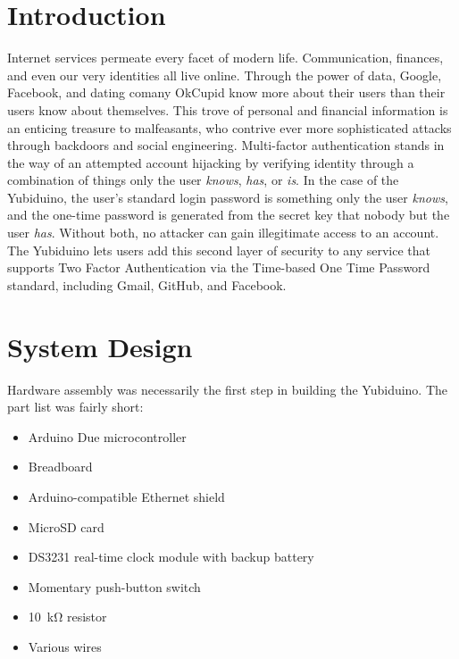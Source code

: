 \documentclass[conference]{IEEEtran}
\begin{document}




%
\IEEEpeerreviewmaketitle



\section{Introduction}
Internet services permeate every facet of modern life. Communication, finances, and even our very identities all live online. Through the power of data, Google, Facebook, and dating comany OkCupid know more about their users than their users know about themselves. This trove of personal and financial information is an enticing treasure to malfeasants, who contrive ever more sophisticated attacks through backdoors and social engineering. Multi-factor authentication stands in the way of an attempted account hijacking by verifying identity through a combination of things only the user \textit{knows}, \textit{has}, or \textit{is}. In the case of the Yubiduino, the user's standard login password is something only the user \textit{knows}, and the one-time password is generated from the secret key that nobody but the user \textit{has}. Without both, no attacker can gain illegitimate access to an account. The Yubiduino lets users add this second layer of security to any service that supports Two Factor Authentication via the Time-based One Time Password standard, including Gmail, GitHub, and Facebook.


\section{System Design}
Hardware assembly was necessarily the first step in building the Yubiduino. The part list was fairly short:

\begin{itemize}
  \item Arduino Due microcontroller
  \item Breadboard
  \item Arduino-compatible Ethernet shield
  \item MicroSD card
  \item DS3231 real-time clock module with backup battery
  \item Momentary push-button switch
  \item \SI{10}{\kohm} resistor
  \item Various wires
\end{itemize}
\end{document}
